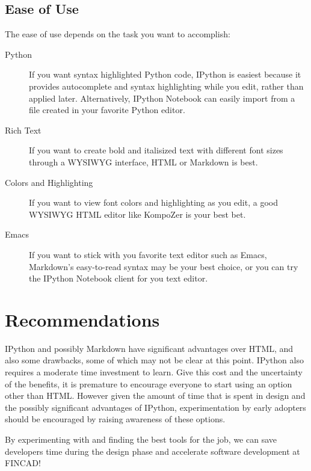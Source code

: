 \documentclass[]{article}
\begin{document}
\subsection{Ease of Use}
The ease of use depends on the task you want to accomplish:
\begin{description}
	\item[Python] 
		If you want syntax highlighted Python code, IPython is easiest because it provides autocomplete and syntax highlighting while 
		you edit, rather than applied later.  Alternatively, IPython Notebook can easily import from a file created in your favorite Python editor.
	\item[Rich Text] 
		If you want to create bold and italisized text with different font sizes through a WYSIWYG interface, HTML or Markdown is best.
	\item[Colors and Highlighting] 
		If you want to view font colors and highlighting as you edit, a good WYSIWYG HTML editor like KompoZer is your best bet.
	\item[Emacs]
		If you want to stick with you favorite text editor such as Emacs, Markdown's easy-to-read syntax may be your best choice, or you can try the IPython Notebook client for you text editor.
\end{description}
	




\section{Recommendations}
	IPython and possibly Markdown have significant advantages over HTML, and also some drawbacks, some of which may not be clear at this point.  
	IPython also requires a moderate time investment to learn.  Give this cost and the uncertainty of the benefits, it is premature to encourage 
	everyone to start using an option other than HTML.  However given the amount of time that is spent in design and the possibly significant 
	advantages of IPython, experimentation by early adopters should be encouraged by raising awareness of these options.
	
	By experimenting with and finding the best tools for the job, 
	we can save developers time during the design phase and accelerate software development at FINCAD!
	
\end{document}
